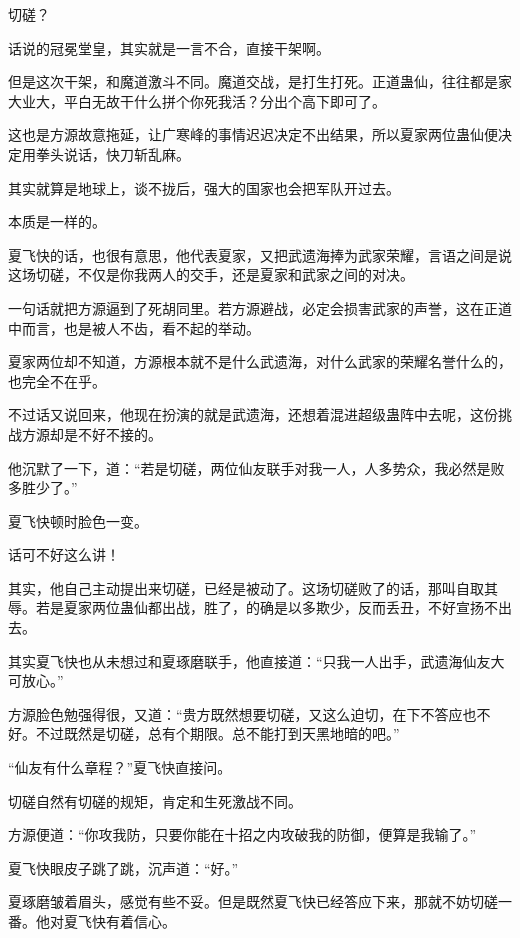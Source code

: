 
\begin{this_body}

切磋？

话说的冠冕堂皇，其实就是一言不合，直接干架啊。

但是这次干架，和魔道激斗不同。魔道交战，是打生打死。正道蛊仙，往往都是家大业大，平白无故干什么拼个你死我活？分出个高下即可了。

这也是方源故意拖延，让广寒峰的事情迟迟决定不出结果，所以夏家两位蛊仙便决定用拳头说话，快刀斩乱麻。

其实就算是地球上，谈不拢后，强大的国家也会把军队开过去。

本质是一样的。

夏飞快的话，也很有意思，他代表夏家，又把武遗海捧为武家荣耀，言语之间是说这场切磋，不仅是你我两人的交手，还是夏家和武家之间的对决。

一句话就把方源逼到了死胡同里。若方源避战，必定会损害武家的声誉，这在正道中而言，也是被人不齿，看不起的举动。

夏家两位却不知道，方源根本就不是什么武遗海，对什么武家的荣耀名誉什么的，也完全不在乎。

不过话又说回来，他现在扮演的就是武遗海，还想着混进超级蛊阵中去呢，这份挑战方源却是不好不接的。

他沉默了一下，道：“若是切磋，两位仙友联手对我一人，人多势众，我必然是败多胜少了。”

夏飞快顿时脸色一变。

话可不好这么讲！

其实，他自己主动提出来切磋，已经是被动了。这场切磋败了的话，那叫自取其辱。若是夏家两位蛊仙都出战，胜了，的确是以多欺少，反而丢丑，不好宣扬不出去。

其实夏飞快也从未想过和夏琢磨联手，他直接道：“只我一人出手，武遗海仙友大可放心。”

方源脸色勉强得很，又道：“贵方既然想要切磋，又这么迫切，在下不答应也不好。不过既然是切磋，总有个期限。总不能打到天黑地暗的吧。”

“仙友有什么章程？”夏飞快直接问。

切磋自然有切磋的规矩，肯定和生死激战不同。

方源便道：“你攻我防，只要你能在十招之内攻破我的防御，便算是我输了。”

夏飞快眼皮子跳了跳，沉声道：“好。”

夏琢磨皱着眉头，感觉有些不妥。但是既然夏飞快已经答应下来，那就不妨切磋一番。他对夏飞快有着信心。


\end{this_body}
